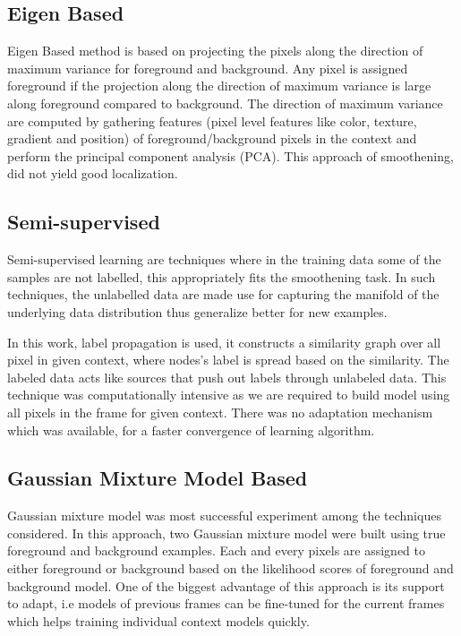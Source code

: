 \subsection{Eigen Based}
Eigen Based method is based on projecting the pixels along the direction of maximum variance for foreground and background.  Any pixel is assigned foreground if the projection along the direction of maximum variance is large along foreground compared to background.  The direction of maximum variance are computed by gathering features (pixel level features like color, texture, gradient and position) of foreground/background pixels in the context and perform the principal component analysis (PCA).  This approach of smoothening, did not yield good localization.

\subsection{Semi-supervised}
Semi-supervised learning are techniques where in the training data some of the samples are not labelled, this appropriately fits the smoothening task.  In such techniques, the unlabelled data are made use for capturing the manifold of the underlying data distribution thus generalize better for new examples. 
\par In this work, label propagation \citep{labprop} is used, it constructs a similarity graph over all pixel in given context, where nodes's label is spread based on the similarity.   The labeled data acts like sources that push out labels through unlabeled data.  This technique was computationally intensive as we are required to build model using all pixels in the frame for given context.  There was no adaptation mechanism which was available, for a faster convergence of learning algorithm.

\subsection{Gaussian Mixture Model Based}
Gaussian mixture model was  most successful experiment among the techniques considered.  In this approach, two Gaussian mixture model were built using true foreground and background examples. Each and every pixels are assigned to either foreground or background based on the likelihood scores of foreground and background model.  One of the biggest advantage of this approach is its support to adapt, i.e models of previous frames can be fine-tuned for the current frames which helps training individual context models quickly.

